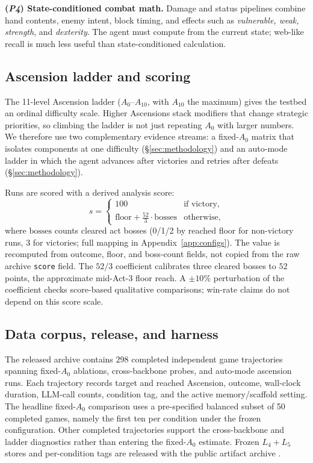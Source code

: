 \textbf{(\emph{P4}) State-conditioned combat math.} Damage and
status pipelines combine hand contents, enemy intent, block timing,
and effects such as \emph{vulnerable, weak, strength}, and
\emph{dexterity}. The agent must compute from the current state;
web-like recall is much less useful than state-conditioned
calculation.

\subsection{Ascension ladder and scoring}
\label{sec:testbed:difficulty}

The 11-level Ascension ladder ($A_0$--$A_{10}$, with $A_{10}$ the
maximum) gives the testbed an ordinal difficulty scale. Higher
Ascensions stack modifiers that change strategic priorities, so
climbing the ladder is not just repeating $A_0$ with larger
numbers. We therefore use two complementary evidence streams: a
fixed-$A_0$ matrix that isolates components at one difficulty
(\S\ref{sec:methodology}) and an auto-mode ladder in which the
agent advances after victories and retries after defeats
(\S\ref{sec:methodology}).

Runs are scored with a derived analysis score:
\begin{equation}
s =
\begin{cases}
100 & \text{if victory,}\\
\mathrm{floor} + \tfrac{52}{3}\cdot\mathrm{bosses} & \text{otherwise,}
\end{cases}
\label{eq:score}
\end{equation}
where $\mathrm{bosses}$ counts cleared act bosses (0/1/2 by reached
floor for non-victory runs, 3 for victories; full mapping in
Appendix~\ref{app:configs}). The value is recomputed from outcome,
floor, and boss-count fields, not copied from the raw archive
\texttt{score} field. The $52/3$ coefficient calibrates three
cleared bosses to $52$ points, the approximate mid-Act-3 floor
reach. A $\pm 10\%$ perturbation of the coefficient checks
score-based qualitative comparisons; win-rate claims do not depend
on this score scale.

\subsection{Data corpus, release, and harness}
\label{sec:testbed:data}

The released archive contains $298$ completed independent game
trajectories spanning fixed-$A_0$ ablations, cross-backbone probes,
and auto-mode ascension runs. Each trajectory records target and
reached Ascension, outcome, wall-clock duration, LLM-call counts,
condition tag, and the active memory/scaffold setting. The headline
fixed-$A_0$ comparison uses a pre-specified balanced subset of 50
completed games, namely the first ten per condition under the
frozen configuration. Other completed trajectories support the
cross-backbone and ladder diagnostics rather than entering the
fixed-$A_0$ estimate. Frozen $L_4{+}L_5$ stores and per-condition tags
are released with the public artifact archive
\citep{deal-checklist-2025,liu-versioning-2025}.


